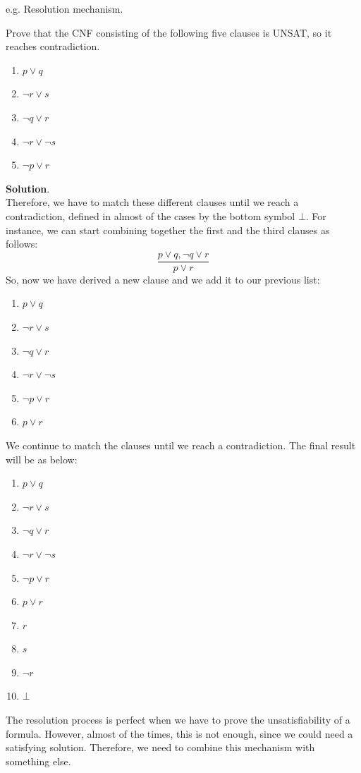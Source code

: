 \begin{example}
    e.g. Resolution mechanism. \vspace{7pt}

    Prove that the CNF consisting of the following five clauses is UNSAT, so it reaches contradiction.
    \begin{enumerate}
        \item $p \vee q$
        \item $\neg r \vee s$
        \item $\neg q \vee r$
        \item $\neg r \vee \neg s$
        \item $\neg p \vee r$
    \end{enumerate} \vspace{7pt}

    \textbf{Solution}. \\ 
    Therefore, we have to match these different clauses until we reach a contradiction, defined in almost of the cases by the bottom symbol $\bot$. For instance,
    we can start combining together the first and the third clauses as follows:
    $$ \frac{p \vee q, \neg q \vee r}{p \vee r} $$
    So, now we have derived a new clause and we add it to our previous list:
    \begin{enumerate}
        \item $p \vee q$
        \item $\neg r \vee s$
        \item $\neg q \vee r$
        \item $\neg r \vee \neg s$
        \item $\neg p \vee r$
        \item $p \vee r$
    \end{enumerate} \vspace{7pt}

    We continue to match the clauses until we reach a contradiction. The final result will be as below:
    \begin{enumerate}
        \item $p \vee q$
        \item $\neg r \vee s$
        \item $\neg q \vee r$
        \item $\neg r \vee \neg s$
        \item $\neg p \vee r$
        \item $p \vee r$
        \item $r$
        \item $s$
        \item $\neg r$
        \item $\bot$
    \end{enumerate}
\end{example}
The resolution process is perfect when we have to prove the unsatisfiability of a formula. However, almost of the times, this is not enough, since we 
could need a satisfying solution. Therefore, we need to combine this mechanism with something else.